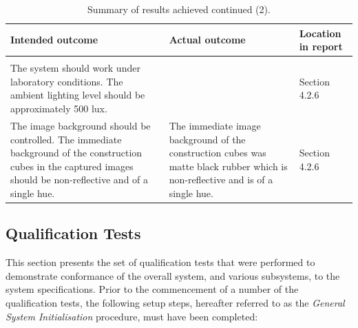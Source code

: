 \begin{table}[H]
	\renewcommand{\arraystretch}{1.3}
	\centering
	\begin{tabular}{|>{\raggedright}m{6cm}|>{\raggedright}m{6cm}|>{\raggedright\arraybackslash}m{2.2cm}|}
		\hline
		\textbf{Intended outcome} & \textbf{Actual outcome} & \textbf{Location in report} \\
		\hline
		\multicolumn{3}{|l|}{\textbf{Field condition requirements and specifications}} \\
		\hline
		The system should work under laboratory conditions. The ambient lighting level should be approximately 500 lux. & & Section 4.2.6 \\
		\hline
		The image background should be controlled. The immediate background of the construction cubes in the captured images should be non-reflective and of a single hue.& The immediate image background of the construction cubes was matte black rubber which is non-reflective and is of a single hue. & Section 4.2.6 \\
		\hline
	\end{tabular}
	\caption{\label{tab:results_summary_p3}Summary of results achieved continued (2).}
\end{table}

\subsection{Qualification Tests}

This section presents the set of qualification tests that were performed to demonstrate conformance of the overall system, and various subsystems, to the system specifications. Prior to the commencement of a number of the qualification tests, the following setup steps, hereafter referred to as the \textit{General System Initialisation} procedure, must have been completed:


